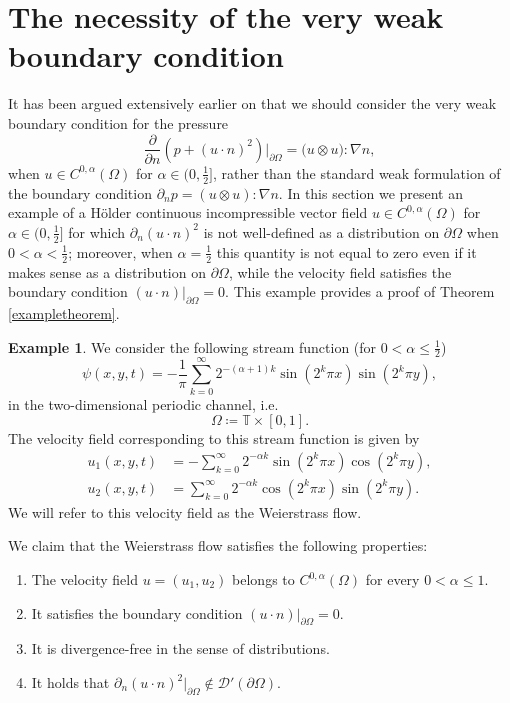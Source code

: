\documentclass[12pt,a4paper]{article}
\theoremstyle{definition}
\newtheorem{example}[theorem]{Example}
\theoremstyle{remark}
\numberwithin{equation}{section}
\begin{document}
\section{The necessity of the very weak boundary condition} \label{examplesection}
It has been argued extensively earlier on that we should consider the very weak boundary condition for the pressure
\begin{equation*}
\frac{\partial}{\partial n} ( p + (u \cdot n)^2 ) \bigg\lvert_{\partial \Omega} = \big( u \otimes u \big) : \nabla n,
\end{equation*}
when $u\in C^{0,\alpha} (\Omega)$ for $\alpha \in (0,\frac{1}{2}]$, rather than the standard weak formulation of the boundary condition $\partial_n p = (u \otimes u) : \nabla n$. In this section we present an example of a H\"older continuous incompressible vector field $u\in C^{0,\alpha} (\Omega)$ for $\alpha \in (0,\frac{1}{2}]$ for which $\partial_n (u \cdot n)^2$ is not well-defined as a distribution on $\partial \Omega$ when $0<\alpha < \frac{1}{2}$; moreover, when $\alpha = \frac{1}{2}$ this quantity is not equal to zero even if it makes sense as a distribution on  $\partial \Omega$, while the velocity field satisfies the boundary condition $(u \cdot n) \lvert_{\partial \Omega} = 0$. This example provides a proof of Theorem \ref{exampletheorem}.
\begin{example} \label{weierstrassexample}
We consider the following stream function (for $0 < \alpha \leq \frac{1}{2}$)
\begin{equation}
\psi (x,y,t) = -\frac{1}{\pi} \sum_{k=0}^\infty 2^{-(\alpha + 1) k} \sin (2^k \pi x) \sin (2^k \pi y),
\end{equation}
in the two-dimensional periodic channel, i.e.
\begin{equation*}
\Omega \coloneqq \mathbb{T} \times [0,1].
\end{equation*} 
The velocity field corresponding to this stream function is given by
\begingroup
\allowdisplaybreaks
\begin{align}
u_1 (x,y,t) &= -\sum_{k=0}^\infty 2^{-\alpha k} \sin (2^k \pi x) \cos (2^k \pi y), \label{weierstrass1} \\
u_2 (x,y,t) &= \sum_{k=0}^\infty 2^{-\alpha k} \cos (2^k \pi x) \sin (2^k \pi y). \label{weierstrass2}
\end{align}
\endgroup
We will refer to this velocity field as the Weierstrass flow.

We claim that the Weierstrass flow satisfies the following properties:
\begin{enumerate}
    \item The velocity field $u = (u_1, u_2)$ belongs to $C^{0,\alpha} (\Omega)$ for every $0 < \alpha \leq 1$.
    \item It satisfies the boundary condition $(u \cdot n)\lvert_{\partial \Omega} = 0$.
    \item It is divergence-free in the sense of distributions.
    \item It holds that $\partial_n (u \cdot n)^2 \lvert_{\partial \Omega} \notin \mathcal{D}' (\partial \Omega)$.
\end{enumerate}
\end{example}
\end{document}
